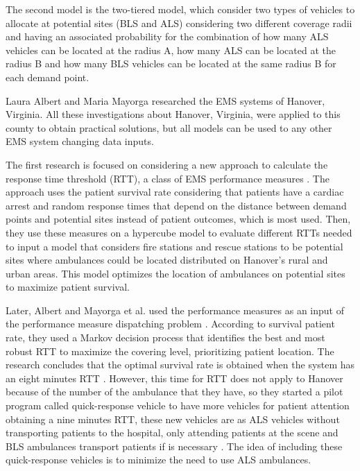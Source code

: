 The second model is the two-tiered model, which consider two types of vehicles to allocate at potential sites (BLS and ALS) considering two different coverage radii and having an associated probability for the combination of how many ALS vehicles can be located at the radius A, how many ALS can be located at the radius B and how many BLS vehicles can be located at the same radius B for each demand point. 

Laura Albert and Maria Mayorga researched the EMS systems of Hanover, Virginia. All these investigations about Hanover, Virginia, were applied to this county to obtain practical solutions, but all models can be used to any other EMS system changing data inputs.

The first research is focused on considering a new approach to calculate the response time threshold (RTT), a class of EMS performance measures \cite{mclay2010evaluating}. The approach uses the patient survival rate considering that patients have a cardiac arrest and random response times that depend on the distance between demand points and potential sites instead of patient outcomes, which is most used. Then, they use these measures on a hypercube model to evaluate different RTTs needed to input a model that considers fire stations and rescue stations to be potential sites where ambulances could be located distributed on Hanover's rural and urban areas. This model optimizes the location of ambulances on potential sites to maximize patient survival. 

Later, Albert and Mayorga et al. used the performance measures as an input of the performance measure dispatching problem \cite{enayati2019identifying}. According to survival patient rate, they used a Markov decision process that identifies the best and most robust RTT to maximize the covering level, prioritizing patient location. The research concludes that the optimal survival rate is obtained when the system has an eight minutes RTT \cite{mclay2011evaluating}. However, this time for RTT does not apply to Hanover because of the number of the ambulance that they have, so they started a pilot program called quick-response vehicle to have more vehicles for patient attention obtaining a nine minutes RTT, these new vehicles are as ALS vehicles without transporting patients to the hospital, only attending patients at the scene and BLS ambulances transport patients if is necessary \cite{mclay2012hanover}. The idea of including these quick-response vehicles is to minimize the need to use ALS ambulances.

